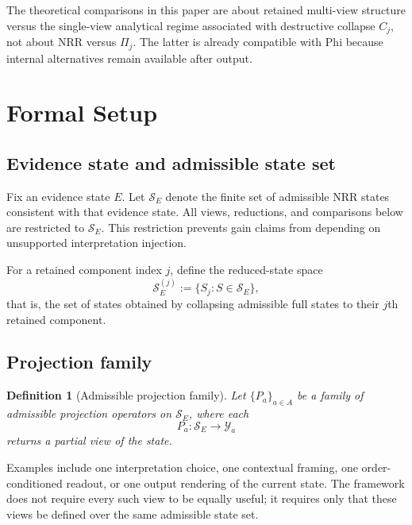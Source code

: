 \documentclass[11pt,a4paper]{article}
\newtheorem{definition}{Definition}
\begin{document}
The theoretical comparisons in this paper are about retained multi-view structure versus the single-view analytical regime associated with destructive collapse $C_j$, not about NRR versus $\Pi_j$. The latter is already compatible with Phi because internal alternatives remain available after output.

\section{Formal Setup}
\label{sec:setup}

\subsection{Evidence state and admissible state set}

Fix an evidence state $E$. Let $\mathcal{S}_E$ denote the finite set of admissible NRR states consistent with that evidence state. All views, reductions, and comparisons below are restricted to $\mathcal{S}_E$. This restriction prevents gain claims from depending on unsupported interpretation injection.

For a retained component index $j$, define the reduced-state space
\begin{equation}
\mathcal{S}_E^{(j)} := \{S_j : S \in \mathcal{S}_E\},
\end{equation}
that is, the set of states obtained by collapsing admissible full states to their $j$th retained component.

\subsection{Projection family}

\begin{definition}[Admissible projection family]
Let $\{P_a\}_{a \in A}$ be a family of admissible projection operators on $\mathcal{S}_E$, where each
\begin{equation}
P_a : \mathcal{S}_E \to \mathcal{Y}_a
\end{equation}
returns a partial view of the state.
\end{definition}

Examples include one interpretation choice, one contextual framing, one order-conditioned readout, or one output rendering of the current state. The framework does not require every such view to be equally useful; it requires only that these views be defined over the same admissible state set.
\end{document}
